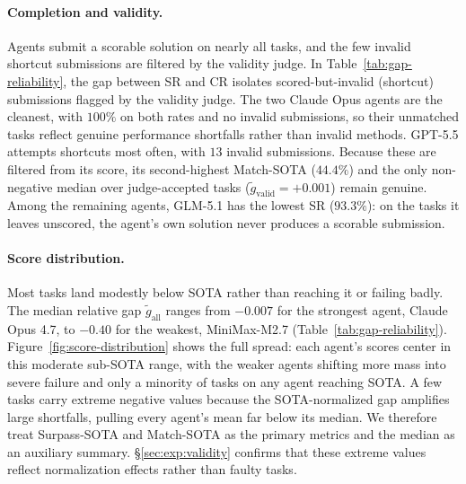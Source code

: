 \paragraph{Completion and validity.}
Agents submit a scorable solution on nearly all tasks, and the few invalid shortcut submissions are filtered by the validity judge. In Table~\ref{tab:gap-reliability}, the gap between SR and CR isolates scored-but-invalid (shortcut) submissions flagged by the validity judge. The two Claude Opus agents are the cleanest, with $100\%$ on both rates and no invalid submissions, so their unmatched tasks reflect genuine performance shortfalls rather than invalid methods. GPT-5.5 attempts shortcuts most often, with $13$ invalid submissions. Because these are filtered from its score, its second-highest Match-SOTA ($44.4\%$) and the only non-negative median over judge-accepted tasks ($\tilde{g}_{\text{valid}} = +0.001$) remain genuine. Among the remaining agents, GLM-5.1 has the lowest SR ($93.3\%$): on the tasks it leaves unscored, the agent's own solution never produces a scorable submission.

\paragraph{Score distribution.}
Most tasks land modestly below SOTA rather than reaching it or failing badly. The median relative gap $\tilde{g}_{\text{all}}$ ranges from $-0.007$ for the strongest agent, Claude Opus 4.7, to $-0.40$ for the weakest, MiniMax-M2.7 (Table~\ref{tab:gap-reliability}). Figure~\ref{fig:score-distribution} shows the full spread: each agent's scores center in this moderate sub-SOTA range, with the weaker agents shifting more mass into severe failure and only a minority of tasks on any agent reaching SOTA. A few tasks carry extreme negative values because the SOTA-normalized gap amplifies large shortfalls, pulling every agent's mean far below its median. We therefore treat Surpass-SOTA and Match-SOTA as the primary metrics and the median as an auxiliary summary. \S\ref{sec:exp:validity} confirms that these extreme values reflect normalization effects rather than faulty tasks.



 
 
 
 
 
 
 
 
 

 
 
 
 
 
 
 
 
 
 
 
 
 
 
 
 
 
 
 
 
 
 
 
 
 
 
 
 
 
 
 
 
 
 
 
 
 
 
 
